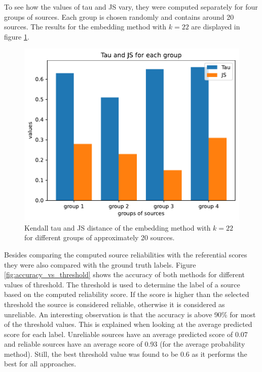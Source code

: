 To see how the values of tau and JS vary, they were computed separately for four groups of sources. Each group is chosen randomly and contains around 20 sources. The results for the embedding method with $k=22$ are displayed in figure \ref{fig:tau_vs_k_groups}.

\begin{figure}[H]
    \centering
    \includegraphics[scale=0.6]{obrazky-figures/tau_js_groups.pdf}
    \caption{Kendall tau and JS distance of the embedding method with $k=22$ for different groups of approximately 20 sources.}
    \label{fig:tau_vs_k_groups}
\end{figure}

Besides comparing the computed source reliabilities with the referential scores they were also compared with the ground truth labels. Figure \ref{fig:accuracy_vs_threshold} shows the accuracy of both methods for different values of threshold. The threshold is used to determine the label of a source based on the computed reliability score. If the score is higher than the selected threshold the source is considered reliable, otherwise it is considered as unreliable. An interesting observation is that the accuracy is above 90\% for most of the threshold values. This is explained when looking at the average predicted score for each label. Unreliable sources have an average predicted score of 0.07 and reliable sources have an average score of 0.93 (for the average probability method). Still, the best threshold value was found to be 0.6 as it performs the best for all approaches.

